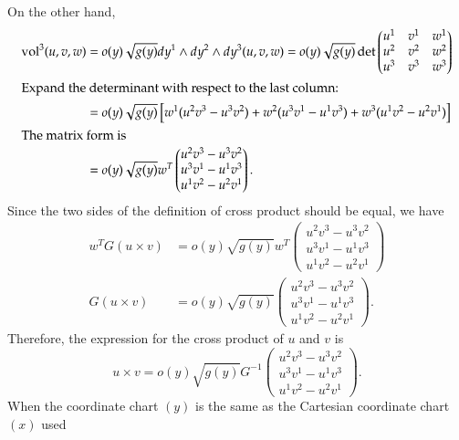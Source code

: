 \documentclass[11pt, a4paper]{book}
\begin{document}
\begin{enumerate}
\begin{itemize}
    On the other hand,
    \begin{align*}
      \mathrm{vol}^3(u,v,w)
      &= o(y) \sqrt{g(y)} dy^1 \wedge dy^2 \wedge dy^3 (u,v,w) = o(y)
        \sqrt{g(y)} \det{\begin{pmatrix}
            u^1 & v^1 & w^1 \\
            u^2 & v^2 & w^2 \\
            u^3 & v^3 & w^3
          \end{pmatrix}} \\
      \intertext{Expand the determinant with respect to the last column:}
      &= o(y) \sqrt{g(y)} \left[ w^1(u^2v^3-u^3v^2) + w^2(u^3v^1-u^1v^3) +
        w^3(u^1v^2-u^2v^1) \right] \\
      \intertext{The matrix form is}
      &= o(y) \sqrt{g(y)} w^T \begin{pmatrix}
        u^2v^3-u^3v^2 \\
        u^3v^1-u^1v^3 \\
        u^1v^2-u^2v^1
      \end{pmatrix}.
    \end{align*}
    Since the two sides of the definition of cross product should be equal, we have
    \begin{align*}
      w^T G(u\times v) &= o(y) \sqrt{g(y)} w^T \begin{pmatrix}
        u^2v^3-u^3v^2 \\
        u^3v^1-u^1v^3 \\
        u^1v^2-u^2v^1
      \end{pmatrix} \\
      G(u\times v) &= o(y) \sqrt{g(y)} \begin{pmatrix}
        u^2v^3-u^3v^2 \\
        u^3v^1-u^1v^3 \\
        u^1v^2-u^2v^1
      \end{pmatrix}.
    \end{align*}
    Therefore, the expression for the cross product of $u$ and $v$ is
    \begin{equation}
      \label{eq:cross-product-expr}
      u\times v = o(y) \sqrt{g(y)} G^{-1} \begin{pmatrix}
        u^2v^3-u^3v^2 \\
        u^3v^1-u^1v^3 \\
        u^1v^2-u^2v^1
      \end{pmatrix}.
    \end{equation}
    When the coordinate chart $(y)$ is the same as the Cartesian coordinate chart $(x)$ used

\end{itemize}
\end{enumerate}
\end{document}
